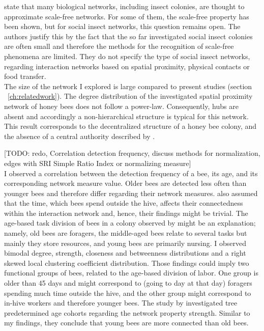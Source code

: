 \textcite{charbonneau2013social} state that many biological networks, including insect colonies, are thought to approximate scale-free networks.
For some of them, the scale-free property has been shown, but for social insect networks, this question remains open.
The authors justify this by the fact that the so far investigated social insect colonies are often small and therefore the methods for the recognition of scale-free phenomena are limited.
They do not specify the type of social insect networks, regarding interaction networks based on spatial proximity, physical contacts or food transfer.\\
The size of the network I explored is large compared to present studies (section ~\ref{ch:relatedwork}). The degree distribution of the investigated spatial proximity network of honey bees does not follow a power-law. Consequently, hubs are absent and accordingly a non-hierarchical structure is typical for this network. This result
corresponds to the decentralized structure of a honey bee colony, and the absence of a central authority described by \textcite{seeley1989honey}.

[TODO: redo, Correlation detection frequency, discuss methods for normalization, edges with SRI Simple Ratio Index or normalizing measure]\\
I observed a correlation between the detection frequency of a bee, its age, and its corresponding network measure value. Older bees are detected less often than younger bees and therefore differ regarding their network measures.
\textcite{baracchi2014socio} also assumed that the time, which bees spend outside the hive, affects their connectedness within the interaction network and, hence, their findings might be trivial.
The age-based task division of bees in a colony observed by \textcite{seeley1989social} might be an explanation; namely, old bees are foragers, the middle-aged bees relate to several tasks but mainly they store resources, and young bees are primarily nursing. I observed bimodal degree, strength, closeness and betweenness distributions and a right skewed local clustering coefficient distribution. Those findings could imply two functional groups of bees, related to the age-based division of labor. One group is older than 45 days and might correspond to (going to day at that day) foragers spending much time outside the hive, and the other group might correspond to in-hive workers and therefore younger bees. The study by \textcite{baracchi2014socio} investigated tree predetermined age cohorts regarding the network property strength. Similar to my findings, they conclude that young bees are more connected than old bees.


